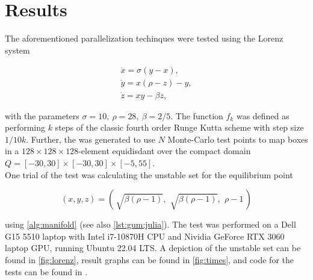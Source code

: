 
\section{Results}

The aforementioned parallelization techinques were tested using the Lorenz system 
\cite*{lorenz}

\begin{gather}
    \dot{x} = \sigma (y - x), \\
    \dot{y} = x (\rho - z) - y, \\
    \dot{z} = xy - \beta z,
\end{gather}

with the parameters $\sigma = 10,\ \rho = 28,\ \beta = 2 / 5$. The function $f_k$ was 
defined as performing $k$ steps of the classic fourth order Runge Kutta scheme with step 
size $1 / 10 k$. Further, the   was generated to use $N$
Monte-Carlo test points to map boxes in a $128 \times 128 \times 128$-element equidisdant 
 over the compact domain 
$Q = [-30,30] \times [-30,30] \times [-5,55]$. \\

One trial of the test was calculating the unstable set for the equilibrium point 

\begin{equation}
    \label{eq:equilibrium}
    (x, y, z) = \left(\,\sqrt{\beta (\rho - 1)},\,\ \sqrt{\beta (\rho - 1)},\,\ \rho - 1\,\right)
\end{equation}

using \autoref{alg:manifold} (see also \autoref{lst:gum:julia}). The test was performed on 
a Dell G15 5510 laptop with Intel i7-10870H CPU and Nividia GeForce RTX 3060 laptop GPU, 
running Ubuntu 22.04 LTS. A depiction of the unstable set can be found in \autoref{fig:lorenz}, 
result graphs can be found in \autoref{fig:times}, and code for the tests can be found 
in \cite*{benchmarks}. \\

